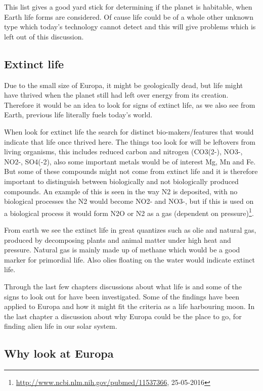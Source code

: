 This list gives a good yard stick for determining if the planet is habitable, when Earth life forms are considered. Of cause life could be of a whole other unknown type which today's technology cannot detect and this will give problems which is left out of this discussion.

\subsection{Extinct life}

Due to the small size of Europa, it might be geologically dead, but life might have thrived when the planet still had left over energy from its creation. Therefore it would be an idea to look for signs of extinct life, as we also see from Earth, previous life literally fuels today's world.

When look for extinct life the search for distinct bio-makers/features that would indicate that life once thrived here. The things too look for will be leftovers from living organisms, this includes reduced carbon and nitrogen (CO3(2-), NO3-, NO2-, SO4(-2), also some important metals would be of interest Mg, Mn and Fe. But some of these compounds might not come from extinct life and it is therefore important to distinguish between biologically and not biologically produced compounds. An example of this is seen in the way N2 is deposited, with no biological processes the N2 would become NO2- and NO3-, but if this is used on a biological process it would form N2O or N2 as a gas  (dependent on pressure)\footnote{\url{http://www.ncbi.nlm.nih.gov/pubmed/11537366}, 25-05-2016}.

From earth we see the extinct life in great quantizes such as olie and natural gas, produced by decomposing plants and animal matter under high heat and pressure. Natural gas is mainly made up of methane which would be a good marker for primordial life. Also olies floating on the water would indicate extinct life.

Through the last few chapters discussions about what life is and some of the signs to look out for have been investigated. Some of the findings have been applied to Europa and how it might fit the criteria as a life harbouring moon. In the last chapter a discussion about why Europa could be the place to go, for finding alien life in our solar system.

\subsection{Why look at Europa}

